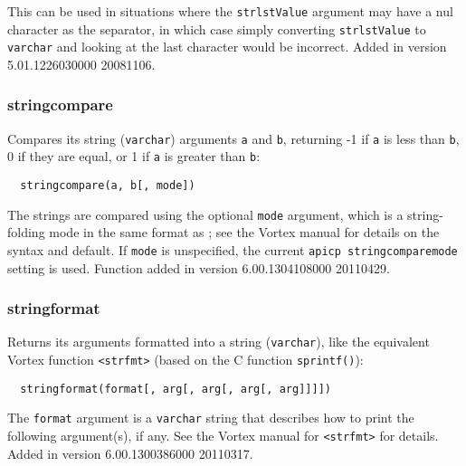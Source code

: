   This can be used in situations where the \verb`strlstValue` argument
may have a nul character as the separator, in which case simply
converting \verb`strlstValue` to \verb`varchar` and looking at the
last character would be incorrect.  Added in version 5.01.1226030000
20081106.

\subsubsection{stringcompare}

  Compares its string (\verb`varchar`) arguments \verb`a` and
\verb`b`, returning -1 if \verb`a` is less than \verb`b`, 0 if they
are equal, or 1 if \verb`a` is greater than \verb`b`:

\begin{verbatim}
  stringcompare(a, b[, mode])
\end{verbatim}

  The strings are compared using the optional \verb`mode` argument,
which is a string-folding mode in the same format as
{\tt <apicp stringcomparemode>}; see the Vortex manual for details on
the syntax and default.  If \verb`mode` is unspecified, the current
{\tt apicp stringcomparemode} setting is used.  Function added
in version 6.00.1304108000 20110429.

\subsubsection{stringformat}

  Returns its arguments formatted into a string (\verb`varchar`), like
the equivalent Vortex function \verb`<strfmt>` (based on the C
function \verb`sprintf()`):

\begin{verbatim}
  stringformat(format[, arg[, arg[, arg[, arg]]]])
\end{verbatim}

  The \verb`format` argument is a \verb`varchar` string that describes
how to print the following argument(s), if any.  See the Vortex manual
for \verb`<strfmt>` for details.  Added in version 6.00.1300386000
20110317.

